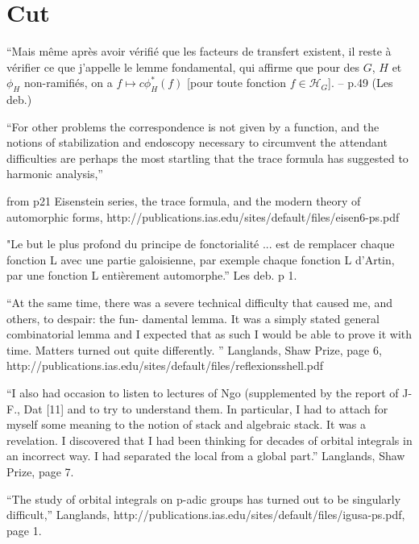 \documentclass[brochure,english,12pt]{bourbaki}
\begin{document}
\section{Cut}


{\narrower \it

``Mais m\^eme apr\`es avoir
v\'erifi\'e que les facteurs de
transfert existent, il reste \`a v\'erifier ce que j'appelle le
lemme fondamental, qui affirme que pour des $G$, $H$ et $\phi_H$
non-ramifi\'es, on a $f\mapsto c \phi_H^*(f)$ [pour toute fonction $f\in {\mathcal H}_G$]. -- p.49 (Les deb.)  
}

\bigskip

``For other problems the correspondence is not given by a function, and the notions of 
stabilization and endoscopy necessary to circumvent the attendant difficulties are perhaps 
the most startling that the trace formula has suggested to harmonic analysis,'' 

from p21 Eisenstein series, the trace formula, and the modern theory of automorphic forms, http://publications.ias.edu/sites/default/files/eisen6-ps.pdf

"Le but le plus profond du principe de fonctorialit\'e ... est de remplacer chaque fonction L avec une partie galoisienne, par exemple chaque fonction L d'Artin, par une fonction L enti\`erement automorphe.'' Les deb. p 1.

``At the same 
time, there was a severe technical difficulty that caused me, and others, to despair: the fun- 
damental lemma. It was a simply stated general combinatorial lemma and I expected that as 
such I would be able to prove it with time. Matters turned out quite differently. ''  Langlands, Shaw Prize, page 6,
http://publications.ias.edu/sites/default/files/reflexionsshell.pdf

``I also had occasion to listen to lectures of Ngo (supplemented by the report of J-F., Dat [11] 
and to try to understand them. In particular, I had to attach for myself some meaning to the 
notion of stack and algebraic stack. It was a revelation. I discovered that I had been thinking 
for decades of orbital integrals in an incorrect way. I had separated the local from a global 
part.'' Langlands, Shaw Prize, page 7.

``The study of orbital integrals on p-adic groups has turned out to be singularly difficult,'' Langlands, 
http://publications.ias.edu/sites/default/files/igusa-ps.pdf,
page 1.

\end{document}
